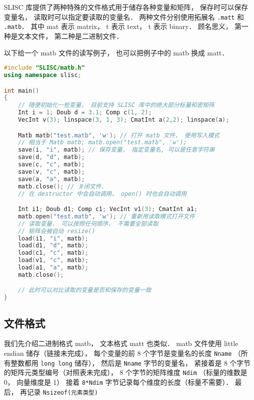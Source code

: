 

SLISC 库提供了两种特殊的文件格式用于储存各种变量和矩阵， 保存时可以保存变量名， 读取时可以指定要读取的变量名． 两种文件分别使用拓展名 \verb|.matt| 和 \verb|.matb|． 其中 mat 表示 matrix， t 表示 text， t 表示 binary． 顾名思义， 第一种是文本文件， 第二种是二进制文件．

以下给一个 matb 文件的读写例子， 也可以把例子中的 matb 换成 matt．

\begin{lstlisting}[language=cpp]
#include "SLISC/matb.h"
using namespace slisc;

int main()
{
    // 随便初始化一些变量， 目前支持 SLISC 库中的绝大部分标量和密矩阵
    Int i = 1; Doub d = 3.1; Comp c(1, 2);
    VecInt v(3); linspace(3, 1, 3); CmatInt a(2,2); linspace(a);

    Matb matb("test.matb", 'w'); // 打开 matb 文件， 使用写入模式
    // 相当于 Matb matb; matb.open("test.matb", 'w');
    save(i, "i", matb); // 保存变量， 指定变量名, 可以是任意字符串
    save(d, "d", matb);
    save(c, "c", matb);
    save(v, "c", matb);
    save(a, "a", matb);
    matb.close(); // 关闭文件．
    // 在 destructor 中会自动调用， open() 时也会自动调用

    Int i1; Doub d1; Comp c1; VecInt v1(3); CmatInt a1;
    matb.open("test.matb", 'w'); // 重新用读取模式打开文件
    // 读取变量， 可以按照任何顺序， 不需要全部读取
    // 矩阵会被自动 resize()
    load(i1, "i", matb); 
    load(d1, "d", matb);
    load(c1, "c", matb);
    load(v1, "c", matb);
    load(a1, "a", matb);
    matb.close();

    // 此时可以对比读取的变量是否和保存的变量一致
}
\end{lstlisting}

\subsection{文件格式}
我们先介绍二进制格式 matb， 文本格式 matt 也类似． matb 文件使用 little endian 储存（链接未完成）， 每个变量的前 8 个字节是变量名的长度 \verb|Nname| （所有整数都用 \verb|long long| 储存）， 然后是 \verb|Nname| 字节的变量名， 紧接着是 8 个字节的矩阵元类型编号（对照表未完成）， 8 个字节的矩阵维度 \verb|Ndim| （标量的维数是 0， 向量维度是 1） 接着 \verb|8*Ndim| 字节记录每个维度的长度（标量不需要）． 最后， 再记录 \verb|Nsizeof(元素类型)|
